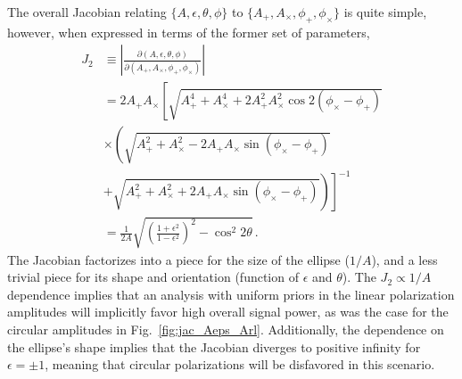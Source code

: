 \documentclass[aps,prd,twocolumn,superscriptaddress,preprintnumbers,floatfix,nofootinbib]{revtex4-2}
\begin{document}
The overall Jacobian relating $\{A, \epsilon, \theta, \phi\}$ to $\{A_+, A_\times, \phi_+, \phi_\times\}$ is quite simple, however, when expressed in terms of the former set of parameters,
\begin{subequations} \label{eq:jac_Aphi}
\begin{align}
J_2 &\equiv \left| \frac{\partial(A, \epsilon, \theta, \phi)}{\partial(A_+, A_\times, \phi_+, \phi_\times)}\right| \nonumber \\
&= 2 A_+ A_\times \left[ \sqrt{A_+^4 + A_\times^4 + 2 A_+^2 A_\times^2 \cos 2(\phi_\times - \phi_+)} \right. \nonumber \\
& \times \left( \sqrt{A_+^2 + A_\times^2 -2 A_+ A_\times \sin(\phi_\times-\phi_+)} \right. \nonumber \\
&\left.\left. +  \sqrt{A_+^2 + A_\times^2 +2 A_+ A_\times \sin(\phi_\times-\phi_+)}\right)\right]^{-1}\\
&= \frac{1}{2 A} \sqrt{\left(\frac{1 + \epsilon^2}{1 - \epsilon^2}\right)^2 - \cos^2 2\theta} \, .
\end{align}
\end{subequations}
The Jacobian factorizes into a piece for the size of the ellipse ($1/A$), and a less trivial piece for its shape and orientation (function of $\epsilon$ and $\theta$).
The $J_2 \propto 1/A$ dependence implies that an analysis with uniform priors in the linear polarization amplitudes will implicitly favor high overall signal power, as was the case for the circular amplitudes in Fig.~\ref{fig:jac_Aeps_Arl}.
Additionally, the dependence on the ellipse's shape implies that the Jacobian diverges to positive infinity for $\epsilon = \pm 1$, meaning that circular polarizations will be disfavored in this scenario.
\end{document}
